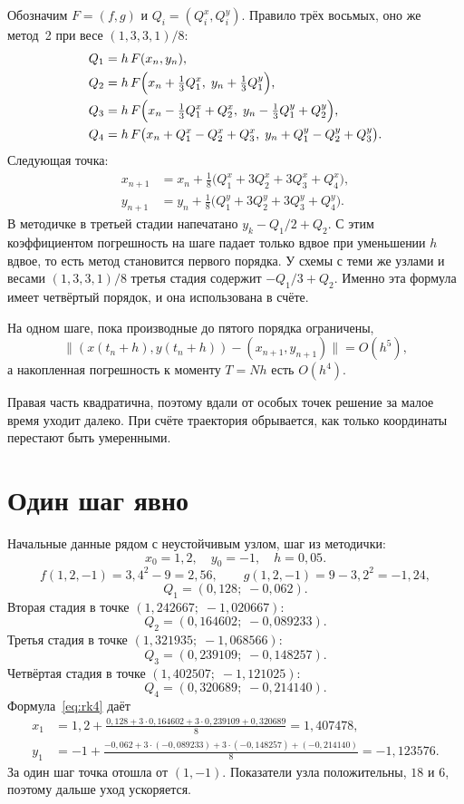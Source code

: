 \documentclass[12pt,a4paper]{article}
\begin{document}
Обозначим \(F = (f,g)\) и \(Q_i = (Q_i^{x}, Q_i^{y})\). Правило трёх восьмых, оно же метод~2 при весе \((1,3,3,1)/8\):
\begin{align}
Q_1 &= h\, F(x_n, y_n), \label{eq:q1}\\
Q_2 &= h\, F\Bigl(x_n + \tfrac13 Q_1^{x},\; y_n + \tfrac13 Q_1^{y}\Bigr), \label{eq:q2}\\
Q_3 &= h\, F\Bigl(x_n - \tfrac13 Q_1^{x} + Q_2^{x},\;
                  y_n - \tfrac13 Q_1^{y} + Q_2^{y}\Bigr), \label{eq:q3}\\
Q_4 &= h\, F\bigl(x_n + Q_1^{x} - Q_2^{x} + Q_3^{x},\;
                  y_n + Q_1^{y} - Q_2^{y} + Q_3^{y}\bigr). \label{eq:q4}
\end{align}
Следующая точка:
\begin{equation}
\label{eq:rk4}
\begin{aligned}
x_{n+1} &= x_n + \frac{1}{8}\bigl(Q_1^{x} + 3Q_2^{x} + 3Q_3^{x} + Q_4^{x}\bigr),\\
y_{n+1} &= y_n + \frac{1}{8}\bigl(Q_1^{y} + 3Q_2^{y} + 3Q_3^{y} + Q_4^{y}\bigr).
\end{aligned}
\end{equation}
В методичке в третьей стадии напечатано \(y_k - Q_1/2 + Q_2\). С этим коэффициентом погрешность на шаге падает только вдвое при уменьшении \(h\) вдвое, то есть метод становится первого порядка. У схемы с теми же узлами и весами \((1,3,3,1)/8\) третья стадия содержит \(-Q_1/3 + Q_2\). Именно эта формула имеет четвёртый порядок, и она использована в счёте.

На одном шаге, пока производные до пятого порядка ограничены,
\[
\|(x(t_n+h), y(t_n+h)) - (x_{n+1}, y_{n+1})\| = O(h^5),
\]
а накопленная погрешность к моменту \(T = Nh\) есть \(O(h^4)\).

Правая часть квадратична, поэтому вдали от особых точек решение за малое время уходит далеко. При счёте траектория обрывается, как только координаты перестают быть умеренными.

\section{Один шаг явно}

Начальные данные рядом с неустойчивым узлом, шаг из методички:
\[
x_0 = 1{,}2, \quad y_0 = -1, \quad h = 0{,}05.
\]
\[
f(1{,}2,-1) = 3{,}4^2 - 9 = 2{,}56,
\qquad
g(1{,}2,-1) = 9 - 3{,}2^2 = -1{,}24,
\]
\[
Q_1 = (0{,}128;\; -0{,}062).
\]
Вторая стадия в точке \((1{,}242667;\; -1{,}020667)\):
\[
Q_2 = (0{,}164602;\; -0{,}089233).
\]
Третья стадия в точке \((1{,}321935;\; -1{,}068566)\):
\[
Q_3 = (0{,}239109;\; -0{,}148257).
\]
Четвёртая стадия в точке \((1{,}402507;\; -1{,}121025)\):
\[
Q_4 = (0{,}320689;\; -0{,}214140).
\]
Формула~\eqref{eq:rk4} даёт
\begin{align*}
x_1 &= 1{,}2 + \frac{0{,}128 + 3\cdot 0{,}164602 + 3\cdot 0{,}239109 + 0{,}320689}{8}
     = 1{,}407478,\\[1mm]
y_1 &= -1 + \frac{-0{,}062 + 3\cdot(-0{,}089233) + 3\cdot(-0{,}148257) + (-0{,}214140)}{8}
     = -1{,}123576.
\end{align*}
За один шаг точка отошла от \((1,-1)\). Показатели узла положительны, \(18\) и \(6\), поэтому дальше уход ускоряется.
\end{document}
